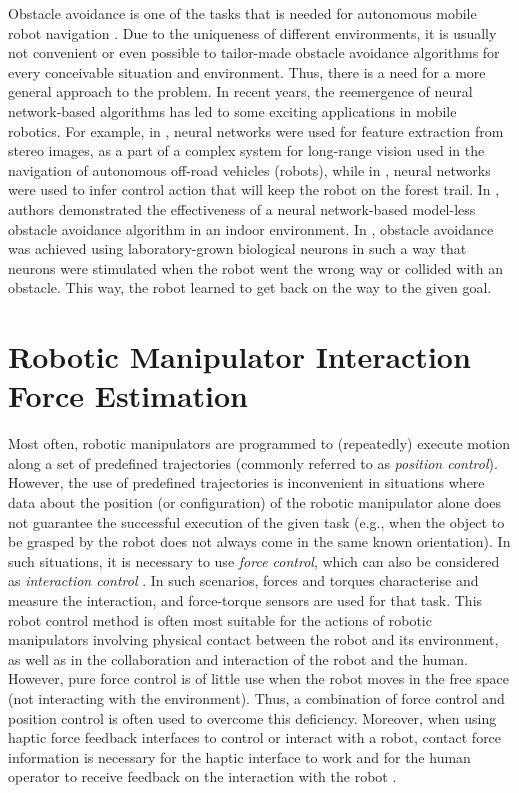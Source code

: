 Obstacle avoidance is one of the tasks that is needed for autonomous mobile robot navigation \cite{Sullivan2017}. Due to the uniqueness of different environments, it is usually not convenient or even possible to tailor-made obstacle avoidance algorithms for every conceivable situation and environment. Thus, there is a need for a more general approach to the problem. In recent years, the reemergence of neural network-based algorithms has led to some exciting applications in mobile robotics. For example, in \cite{Hadsell2009}, neural networks were used for feature extraction from stereo images, as a part of a complex system for long-range vision used in the navigation of autonomous off-road vehicles (robots), while in \cite{Giusti2016}, neural networks were used to infer control action that will keep the robot on the forest trail. In \cite{Tai2016}, authors demonstrated the effectiveness of a neural network-based model-less obstacle avoidance algorithm in an indoor environment. In \cite{Yada2021}, obstacle avoidance was achieved using laboratory-grown biological neurons in such a way that neurons were stimulated when the robot went the wrong way or collided with an obstacle. This way, the robot learned to get back on the way to the given goal.

\section{Robotic Manipulator Interaction Force Estimation}

Most often, robotic manipulators are programmed to (repeatedly) execute motion along a set of predefined trajectories (commonly referred to as \emph{position control}).  However, the use of predefined trajectories is inconvenient in situations where data about the position (or configuration) of the robotic manipulator alone does not guarantee the successful execution of the given task (e.g., when the object to be grasped by the robot does not always come in the same known orientation). In such situations, it is necessary to use \emph{force control}, which can also be considered as \emph{interaction control} \cite{Siciliano1999}. In such scenarios, forces and torques characterise and measure the interaction, and force-torque sensors are used for that task. This robot control method is often most suitable for the actions of robotic manipulators involving physical contact between the robot and its environment, as well as in the collaboration and interaction of the robot and the human. However, pure force control is of little use when the robot moves in the free space (not interacting with the environment). Thus, a combination of force control and position control is often used to overcome this deficiency. Moreover, when using haptic force feedback interfaces to control or interact with a robot, contact force information is necessary for the haptic interface to work and for the human operator to receive feedback on the interaction with the robot \cite{Song2019}.

